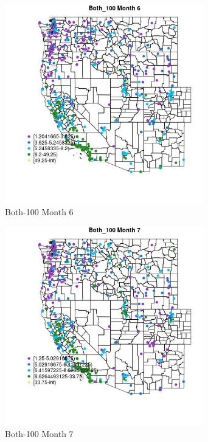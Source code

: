 \begin{figure} 
\centering  
\includegraphics[width=0.77\textwidth]{Code_Outputs/ML_input_report_ML_input_PM25_Step5_part_d_de_duplicated_aves_ML_input_MapObsMo6Both_100.jpg} 
\caption{\label{fig:ML_input_report_ML_input_PM25_Step5_part_d_de_duplicated_aves_ML_inputMapObsMo6Both_100}Both-100 Month 6} 
\end{figure} 
 

\begin{figure} 
\centering  
\includegraphics[width=0.77\textwidth]{Code_Outputs/ML_input_report_ML_input_PM25_Step5_part_d_de_duplicated_aves_ML_input_MapObsMo7Both_100.jpg} 
\caption{\label{fig:ML_input_report_ML_input_PM25_Step5_part_d_de_duplicated_aves_ML_inputMapObsMo7Both_100}Both-100 Month 7} 
\end{figure} 
 

